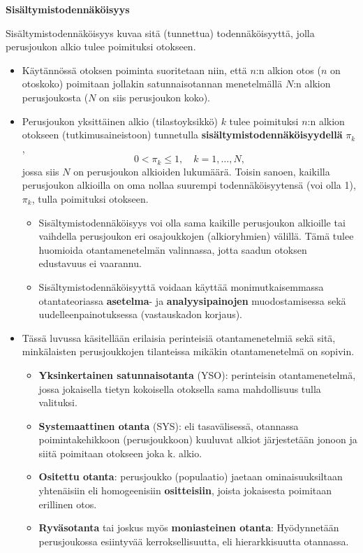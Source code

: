 \documentclass[
]{book}
\providecommand{\tightlist}{%
  \setlength{\itemsep}{0pt}\setlength{\parskip}{0pt}}
\begin{document}
\begin{defblock}{}
\textbf{Sisältymistodennäköisyys}

Sisältymistodennäköisyys kuvaa sitä (tunnettua) todennäköisyyttä, jolla perusjoukon alkio tulee poimituksi otokseen.

\end{defblock}

\begin{itemize}
\tightlist
\item
  Käytännössä otoksen poiminta suoritetaan niin, että \(n\):n alkion otos (\(n\) on otoskoko) poimitaan jollakin satunnaisotannan menetelmällä \(N\):n alkion perusjoukosta (\(N\) on siis perusjoukon koko).
\item
  Perusjoukon yksittäinen alkio (tilastoyksikkö) \(k\) tulee poimituksi \(n\):n alkion otokseen (tutkimusaineistoon) tunnetulla \textbf{sisältymistodennäköisyydellä} \(\pi_k\),
  \[
  0 < \pi_k \le 1, \quad k = 1, \ldots, N,
  \]
  jossa siis \(N\) on perusjoukon alkioiden lukumäärä. Toisin sanoen, kaikilla perusjoukon alkioilla on oma nollaa suurempi todennäköisyytensä (voi olla 1), \(\pi_k\), tulla poimituksi otokseen.

  \begin{itemize}
  \tightlist
  \item
    Sisältymistodennäköisyys voi olla sama kaikille perusjoukon alkioille tai vaihdella perusjoukon eri osajoukkojen (alkioryhmien) välillä. Tämä tulee huomioida otantamenetelmän valinnassa, jotta saadun otoksen edustavuus ei vaarannu.
  \item
    Sisältymistodennäköisyyttä voidaan käyttää monimutkaisemmassa otantateoriassa \textbf{asetelma}- ja \textbf{analyysipainojen} muodostamisessa sekä uudelleenpainotuksessa (vastauskadon korjaus).
  \end{itemize}
\item
  Tässä luvussa käsitellään erilaisia perinteisiä otantamenetelmiä sekä sitä, minkälaisten perusjoukkojen tilanteissa mikäkin otantamenetelmä on sopivin.

  \begin{itemize}
  \tightlist
  \item
    \textbf{Yksinkertainen satunnaisotanta} (YSO): perinteisin otantamenetelmä, jossa jokaisella tietyn kokoisella otoksella sama mahdollisuus tulla valituksi.
  \item
    \textbf{Systemaattinen otanta} (SYS): eli tasavälisessä, otannassa poimintakehikkoon (perusjoukkoon) kuuluvat alkiot järjestetään jonoon ja siitä poimitaan otokseen joka k. alkio.
  \item
    \textbf{Ositettu otanta}: perusjoukko (populaatio) jaetaan ominaisuuksiltaan yhtenäisiin eli homogeenisiin \textbf{ositteisiin}, joista jokaisesta poimitaan erillinen otos.
  \item
    \textbf{Ryväsotanta} tai joskus myös \textbf{moniasteinen otanta}: Hyödynnetään perusjoukossa esiintyvää kerroksellisuutta, eli hierarkkisuutta otannassa.
  \end{itemize}
\end{itemize}
\end{document}
